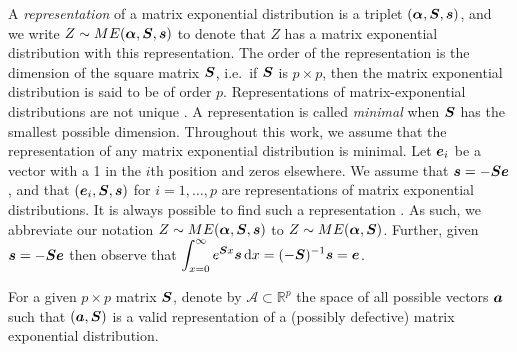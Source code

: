 A \emph{representation} of a matrix exponential distribution is a triplet \((\boldsymbol \alpha, \boldsymbol S, \boldsymbol s)\), and we write \(Z\sim ME(\boldsymbol \alpha, \boldsymbol S, \boldsymbol s)\) to denote that \(Z\) has a matrix exponential distribution with this representation. The order of the representation is the dimension of the square matrix \(\boldsymbol S\), i.e.~if \(\boldsymbol S\) is \(p\times p\), then the matrix exponential distribution is said to be of order \(p\). Representations of matrix-exponential distributions are not unique \citep{MEinAP}. A representation is called \emph{minimal} when \(\boldsymbol S\) has the smallest possible dimension. Throughout this work, we assume that the representation of any matrix exponential distribution is minimal. Let \(\boldsymbol e_i\) be a vector with a 1 in the \(i\)th position and zeros elsewhere. We assume that \(\boldsymbol s = -\boldsymbol S\boldsymbol e\), and that \((\boldsymbol e_i,\boldsymbol S,\boldsymbol s)\) for \(i=1,\dots,p\) are representations of matrix exponential distributions. It is always possible to find such a representation \cite[Theorem 4.5.17, Corollary 4.5.18]{MEinAP}. As such, we abbreviate our notation \(Z\sim ME(\boldsymbol \alpha, \boldsymbol S, \boldsymbol s)\) to \(Z\sim ME(\boldsymbol \alpha, \boldsymbol S)\). Further, given \(\boldsymbol s=-\boldsymbol S\boldsymbol e\) then observe that  \(\displaystyle \int_{x=0}^\infty e^{\boldsymbol S x} \boldsymbol s\, \mathrm{d} x = (-\boldsymbol S)^{-1}\boldsymbol s= \boldsymbol e\). 

For a given \(p\times p\) matrix \(\boldsymbol S\), denote by \(\mathcal{A}\subset \mathbb R^p\) the space of all possible vectors \(\boldsymbol a\) such that \((\boldsymbol a, \boldsymbol S)\) is a valid representation of a (possibly defective) matrix exponential distribution.

